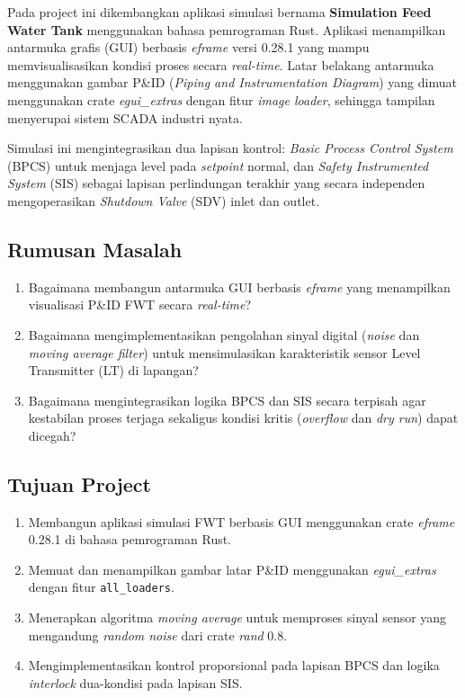 \documentclass[12pt,a4paper]{article}
\begin{document}
Pada project ini dikembangkan aplikasi simulasi bernama \textbf{Simulation
Feed Water Tank} menggunakan bahasa pemrograman Rust. Aplikasi menampilkan
antarmuka grafis (GUI) berbasis \textit{eframe} versi 0.28.1 yang mampu
memvisualisasikan kondisi proses secara \textit{real-time}. Latar belakang
antarmuka menggunakan gambar P\&ID (\textit{Piping and Instrumentation
Diagram}) yang dimuat menggunakan crate \textit{egui\_extras} dengan fitur
\textit{image loader}, sehingga tampilan menyerupai sistem SCADA industri nyata.

Simulasi ini mengintegrasikan dua lapisan kontrol:
\textit{Basic Process Control System} (BPCS) untuk menjaga level pada
\textit{setpoint} normal, dan \textit{Safety Instrumented System} (SIS)
sebagai lapisan perlindungan terakhir yang secara independen mengoperasikan
\textit{Shutdown Valve} (SDV) inlet dan outlet.

\subsection{Rumusan Masalah}
\begin{enumerate}
    \item Bagaimana membangun antarmuka GUI berbasis \textit{eframe} yang
          menampilkan visualisasi P\&ID FWT secara \textit{real-time}?
    \item Bagaimana mengimplementasikan pengolahan sinyal digital
          (\textit{noise} dan \textit{moving average filter}) untuk
          mensimulasikan karakteristik sensor Level Transmitter (LT)
          di lapangan?
    \item Bagaimana mengintegrasikan logika BPCS dan SIS secara terpisah
          agar kestabilan proses terjaga sekaligus kondisi kritis
          (\textit{overflow} dan \textit{dry run}) dapat dicegah?
\end{enumerate}

\subsection{Tujuan Project}
\begin{enumerate}
    \item Membangun aplikasi simulasi FWT berbasis GUI menggunakan crate
          \textit{eframe} 0.28.1 di bahasa pemrograman Rust.
    \item Memuat dan menampilkan gambar latar P\&ID menggunakan
          \textit{egui\_extras} dengan fitur \texttt{all\_loaders}.
    \item Menerapkan algoritma \textit{moving average} untuk memproses
          sinyal sensor yang mengandung \textit{random noise} dari crate
          \textit{rand} 0.8.
    \item Mengimplementasikan kontrol proporsional pada lapisan BPCS dan
          logika \textit{interlock} dua-kondisi pada lapisan SIS.
\end{enumerate}
\end{document}
